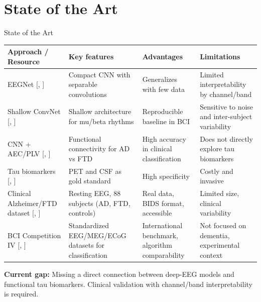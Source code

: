 \documentclass{beamer}
\renewcommand{\parencite}[1]{[\citeauthor{#1}, \citeyear{#1}]}
\renewcommand{\cite}[1]{\parencite{#1}}
\begin{document}
\section{State of the Art}
\begin{frame}{State of the Art}
\scriptsize
\renewcommand{\arraystretch}{0.8} %
\vspace{-0.8cm}
\begin{table}
\centering
\begin{tabular}{p{2.6cm} p{2.6cm} p{2.6cm} p{2.6cm}}
\textbf{Approach / Resource} & \textbf{Key features} & \textbf{Advantages} & \textbf{Limitations} \\
\hline
EEGNet {\tiny\cite{Lawhern2018}} & Compact CNN with separable convolutions & Generalizes with few data & Limited interpretability by channel/band \\
\hline
Shallow ConvNet {\tiny\cite{Schirrmeister2017}} & Shallow architecture for mu/beta rhythms & Reproducible baseline in BCI & Sensitive to noise and inter-subject variability \\
\hline
CNN + AEC/PLV {\tiny\cite{Ajra2023}} & Functional connectivity for AD vs FTD & High accuracy in clinical classification & Does not directly explore tau biomarkers \\
\hline
Tau biomarkers {\tiny\cite{dePaula2009}} & PET and CSF as gold standard & High specificity & Costly and invasive \\
\hline
Clinical Alzheimer/FTD dataset {\tiny\cite{MDPI2023}} & Resting EEG, 88 subjects (AD, FTD, controls) & Real data, BIDS format, accessible & Limited size, clinical variability \\
\hline
BCI Competition IV {\tiny\cite{Blankertz2008}} & Standardized EEG/MEG/ECoG datasets for classification & International benchmark, algorithm comparability & Not focused on dementia, experimental context \\
\hline
\end{tabular}
\end{table}

\vspace{-0.3cm}
\textbf{Current gap:} Missing a direct connection between deep-EEG models and functional tau biomarkers. Clinical validation with channel/band interpretability is required.
\end{frame}
\end{document}
